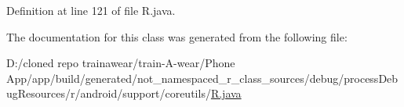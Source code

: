 Definition at line 121 of file R.\+java.



The documentation for this class was generated from the following file\+:\begin{DoxyCompactItemize}
\item 
D\+:/cloned repo trainawear/train-\/\+A-\/wear/\+Phone App/app/build/generated/not\+\_\+namespaced\+\_\+r\+\_\+class\+\_\+sources/debug/process\+Debug\+Resources/r/android/support/coreutils/\mbox{\hyperlink{process_debug_resources_2r_2android_2support_2coreutils_2_r_8java}{R.\+java}}\end{DoxyCompactItemize}
